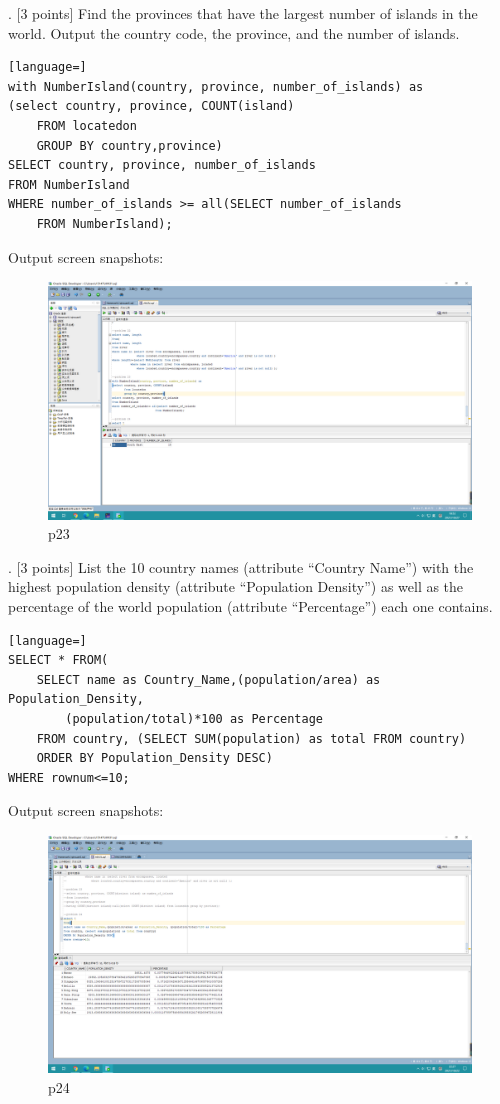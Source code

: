 \documentclass[]{article}
\begin{document}
	. [3 points] Find the provinces that have the largest number of islands in the world. Output the country code, the province, and the number of islands.    \\
	
	\begin{lstlisting}[language=] 
with NumberIsland(country, province, number_of_islands) as
(select country, province, COUNT(island)
	FROM locatedon
	GROUP BY country,province)
SELECT country, province, number_of_islands
FROM NumberIsland
WHERE number_of_islands >= all(SELECT number_of_islands
	FROM NumberIsland);
	\end{lstlisting} 
	Output screen snapshots:
	\begin{figure}[H]
		\centering
		\includegraphics[width=0.87\linewidth]{../screen/p23}
		\caption{p23}
		\label{fig:p23}
	\end{figure}
	
	. [3 points] List the 10 country names (attribute “Country Name”) with the highest population density (attribute “Population Density”) as well as the percentage of the world population (attribute “Percentage”) each one contains.    \\
	
	\begin{lstlisting}[language=] 
SELECT * FROM(
	SELECT name as Country_Name,(population/area) as Population_Density,
	 	(population/total)*100 as Percentage
	FROM country, (SELECT SUM(population) as total FROM country)
	ORDER BY Population_Density DESC)
WHERE rownum<=10;
	\end{lstlisting} 
	Output screen snapshots:
	\begin{figure}[H]
		\centering
		\includegraphics[width=0.87\linewidth]{../screen/p24}
		\caption{p24}
		\label{fig:p24}
	\end{figure}
	
\end{document}
